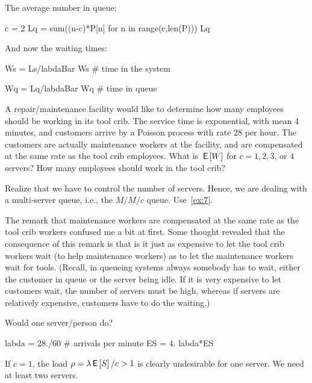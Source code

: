 \begin{extra}[Hall 5.8]
\begin{solution}
The average number in queue: 
\begin{pyconsole}
c = 2
Lq = sum((n-c)*P[n] for n in range(c,len(P)))
Lq
\end{pyconsole} 

And now the waiting times:

\begin{pyconsole}
Ws = Ls/labdaBar
Ws # time in the system

Wq = Lq/labdaBar
Wq # time in queue
\end{pyconsole} 

\end{solution}
\end{extra}

\begin{exercise}[Hall 5.10] 
A repair/maintenance facility would like to determine how many employees should be working in its tool crib.
  The service time is exponential, with mean 4 minutes, and customers arrive by a Poisson process with rate 28 per hour.
  The customers are actually maintenance workers at the facility, and are compensated at the same rate as the tool crib employees.
  What is $\,\mathsf{E}\left[W\right]$ for $c=1, 2, 3$, or $4$ servers?
  How many employees should work in the tool crib?
\begin{hint}
    Realize that we have to control the number of servers.
    Hence, we are dealing with a multi-server queue, i.e., the $M/M/c$ queue.
    Use~\cref{ex:7}.

The remark that maintenance workers are compensated at the same rate
as the tool crib workers confused me a bit at first.  Some thought
revealed that the consequence of this remark is that is it just as
expensive to let the tool crib workers wait (to help maintenance
workers) as to let the maintenance workers wait for tools. (Recall, in
queueing systems always somebody has to wait, either the customer in queue or
the server being idle. If it is very expensive to let customers wait, the number
of servers must be high, whereas if servers are relatively expensive, customers have to do the waiting.)
\end{hint}
\begin{solution}

      Would one server/person do? 
\begin{pyconsole}
labda = 28./60 # arrivals per minute
ES = 4.
labda*ES
\end{pyconsole} 

If $c=1$, the load $\rho=\lambda \,\mathsf{E}\left[S\right]/c >1$ is clearly undesirable for one server.  We need at
least two servers.


\end{solution}
\end{exercise}
